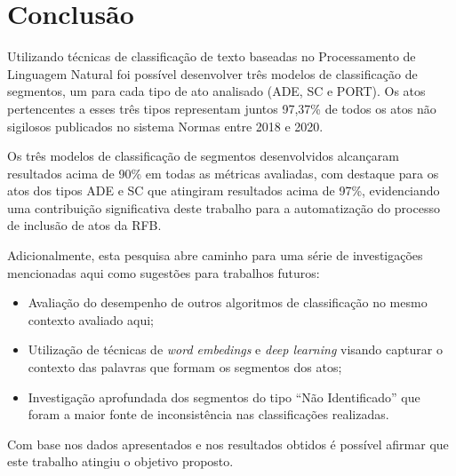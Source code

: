 \section{Conclusão}

Utilizando técnicas de classificação de texto baseadas no Processamento de Linguagem Natural foi possível desenvolver três modelos de classificação de segmentos, um para cada tipo de ato analisado (ADE, SC e PORT). Os atos pertencentes a esses três tipos representam juntos 97,37\% de todos os atos não sigilosos publicados no sistema Normas entre 2018 e 2020.

Os três modelos de classificação de segmentos desenvolvidos alcançaram resultados acima de 90\% em todas as métricas avaliadas, com destaque para os atos dos tipos ADE e SC que atingiram resultados acima de 97\%, evidenciando uma contribuição significativa deste trabalho para a automatização do processo de inclusão de atos da RFB.


Adicionalmente, esta pesquisa abre caminho para uma série de investigações mencionadas aqui como sugestões para trabalhos futuros: 
\begin{itemize}
	\item Avaliação do desempenho de outros algoritmos de classificação no mesmo contexto avaliado aqui;
	\item Utilização de técnicas de \textit{word embedings} e \textit{deep learning} visando capturar o contexto das palavras que formam os segmentos dos atos;
	\item Investigação aprofundada dos segmentos do tipo ``Não Identificado'' que foram a maior fonte de inconsistência nas classificações realizadas.
\end{itemize}

Com base nos dados apresentados e nos resultados obtidos é possível afirmar que este trabalho atingiu o objetivo proposto.


\begin{figure}
\label{fig:fake}
\end{figure}